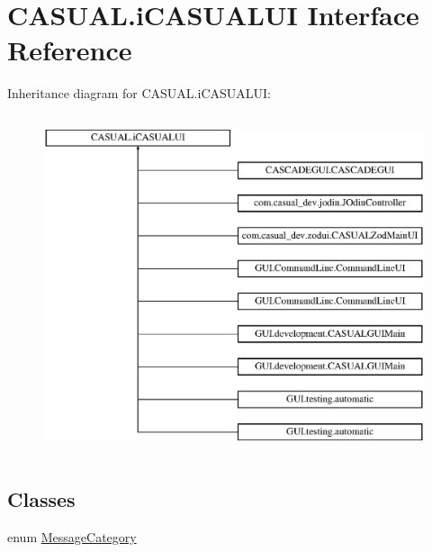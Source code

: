 \hypertarget{interface_c_a_s_u_a_l_1_1i_c_a_s_u_a_l_u_i}{\section{C\-A\-S\-U\-A\-L.\-i\-C\-A\-S\-U\-A\-L\-U\-I Interface Reference}
\label{interface_c_a_s_u_a_l_1_1i_c_a_s_u_a_l_u_i}
}
Inheritance diagram for C\-A\-S\-U\-A\-L.\-i\-C\-A\-S\-U\-A\-L\-U\-I\-:\begin{figure}[H]
\begin{center}
\leavevmode
\includegraphics[height=10.000000cm]{interface_c_a_s_u_a_l_1_1i_c_a_s_u_a_l_u_i}
\end{center}
\end{figure}
\subsection*{Classes}
\begin{DoxyCompactItemize}
\item 
enum \hyperlink{enum_c_a_s_u_a_l_1_1i_c_a_s_u_a_l_u_i_1_1_message_category}{Message\-Category}
\end{DoxyCompactItemize}
